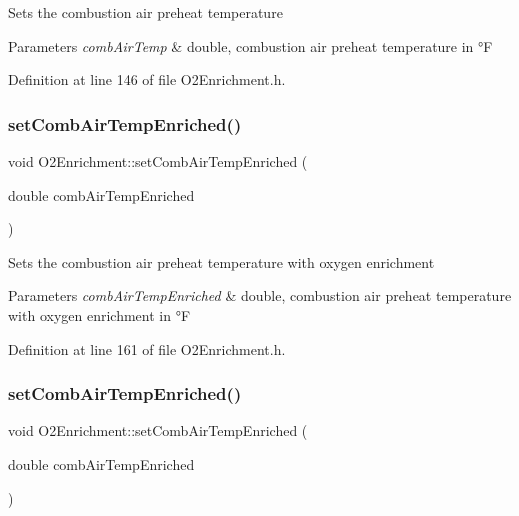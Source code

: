 Sets the combustion air preheat temperature 
\begin{DoxyParams}{Parameters}
{\em comb\+Air\+Temp} & double, combustion air preheat temperature in °F \\
\hline
\end{DoxyParams}


Definition at line 146 of file O2\+Enrichment.\+h.

\mbox{\label{class_o2_enrichment_af245c75ea525a0f5955686b360b54dbb}} 
\subsubsection{\texorpdfstring{set\+Comb\+Air\+Temp\+Enriched()}{setCombAirTempEnriched()}\hspace{0.1cm}{\footnotesize\ttfamily [1/3]}}
{\footnotesize\ttfamily void O2\+Enrichment\+::set\+Comb\+Air\+Temp\+Enriched (\begin{DoxyParamCaption}\item[{double}]{comb\+Air\+Temp\+Enriched }\end{DoxyParamCaption})\hspace{0.3cm}{\ttfamily [inline]}}

Sets the combustion air preheat temperature with oxygen enrichment 
\begin{DoxyParams}{Parameters}
{\em comb\+Air\+Temp\+Enriched} & double, combustion air preheat temperature with oxygen enrichment in °F \\
\hline
\end{DoxyParams}


Definition at line 161 of file O2\+Enrichment.\+h.

\mbox{\label{class_o2_enrichment_af245c75ea525a0f5955686b360b54dbb}} 
\subsubsection{\texorpdfstring{set\+Comb\+Air\+Temp\+Enriched()}{setCombAirTempEnriched()}\hspace{0.1cm}{\footnotesize\ttfamily [2/3]}}
{\footnotesize\ttfamily void O2\+Enrichment\+::set\+Comb\+Air\+Temp\+Enriched (\begin{DoxyParamCaption}\item[{double}]{comb\+Air\+Temp\+Enriched }\end{DoxyParamCaption})\hspace{0.3cm}{\ttfamily [inline]}}

